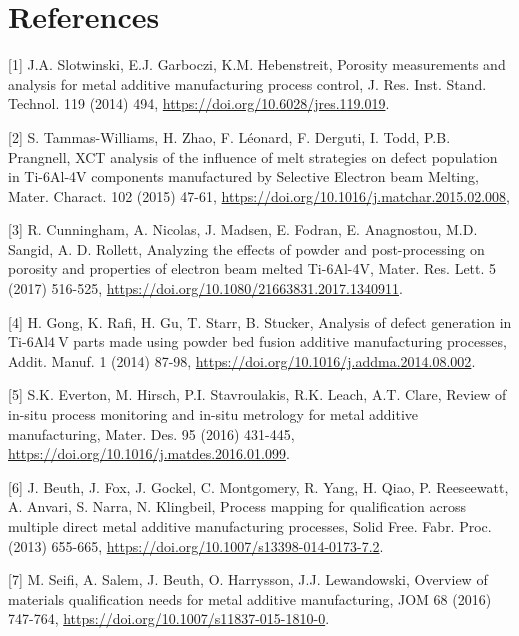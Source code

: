 \documentclass[10pt]{article}
\begin{document}
\section*{References}
[1] J.A. Slotwinski, E.J. Garboczi, K.M. Hebenstreit, Porosity measurements and analysis for metal additive manufacturing process control, J. Res. Inst. Stand. Technol. 119 (2014) 494, \href{https://doi.org/10.6028/jres.119.019}{https://doi.org/10.6028/jres.119.019}.

[2] S. Tammas-Williams, H. Zhao, F. Léonard, F. Derguti, I. Todd, P.B. Prangnell, XCT analysis of the influence of melt strategies on defect population in Ti-6Al-4V components manufactured by Selective Electron beam Melting, Mater. Charact. 102 (2015) 47-61, \href{https://doi.org/10.1016/j.matchar.2015.02.008}{https://doi.org/10.1016/j.matchar.2015.02.008},

[3] R. Cunningham, A. Nicolas, J. Madsen, E. Fodran, E. Anagnostou, M.D. Sangid, A. D. Rollett, Analyzing the effects of powder and post-processing on porosity and properties of electron beam melted Ti-6Al-4V, Mater. Res. Lett. 5 (2017) 516-525, \href{https://doi.org/10.1080/21663831.2017.1340911}{https://doi.org/10.1080/21663831.2017.1340911}.

[4] H. Gong, K. Rafi, H. Gu, T. Starr, B. Stucker, Analysis of defect generation in Ti-6Al$4 \mathrm{~V}$ parts made using powder bed fusion additive manufacturing processes, Addit. Manuf. 1 (2014) 87-98, \href{https://doi.org/10.1016/j.addma.2014.08.002}{https://doi.org/10.1016/j.addma.2014.08.002}.

[5] S.K. Everton, M. Hirsch, P.I. Stavroulakis, R.K. Leach, A.T. Clare, Review of in-situ process monitoring and in-situ metrology for metal additive manufacturing, Mater. Des. 95 (2016) 431-445, \href{https://doi.org/10.1016/j.matdes.2016.01.099}{https://doi.org/10.1016/j.matdes.2016.01.099}.

[6] J. Beuth, J. Fox, J. Gockel, C. Montgomery, R. Yang, H. Qiao, P. Reeseewatt, A. Anvari, S. Narra, N. Klingbeil, Process mapping for qualification across multiple direct metal additive manufacturing processes, Solid Free. Fabr. Proc. (2013) 655-665, \href{https://doi.org/10.1007/s13398-014-0173-7.2}{https://doi.org/10.1007/s13398-014-0173-7.2}.

[7] M. Seifi, A. Salem, J. Beuth, O. Harrysson, J.J. Lewandowski, Overview of materials qualification needs for metal additive manufacturing, JOM 68 (2016) 747-764, \href{https://doi.org/10.1007/s11837-015-1810-0}{https://doi.org/10.1007/s11837-015-1810-0}.
\end{document}
